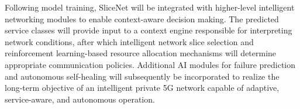 \documentclass[12pt,a4paper]{report}
\begin{document}
	Following model training, SliceNet will be integrated with higher-level intelligent networking modules to enable context-aware decision making. The predicted service classes will provide input to a context engine responsible for interpreting network conditions, after which intelligent network slice selection and reinforcement learning-based resource allocation mechanisms will determine appropriate communication policies. Additional AI modules for failure prediction and autonomous self-healing will subsequently be incorporated to realize the long-term objective of an intelligent private 5G network capable of adaptive, service-aware, and autonomous operation.
	

\end{document}
